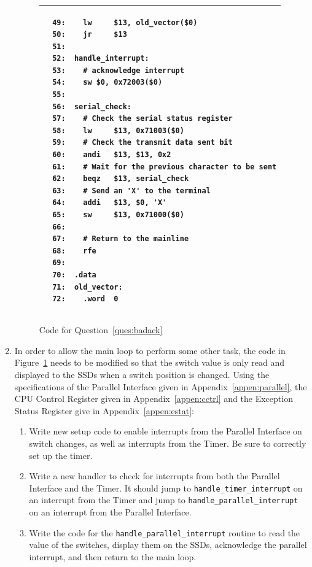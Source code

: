 \documentclass[a4paper,10pt]{article}
\begin{document}
\begin{enumerate}
\begin{figure}[p]
\begin{footnotesize}
\begin{center}
\begin{tabular}{|p{12cm}|}
\begin{verbatim}
  49:    lw     $13, old_vector($0)
  50:    jr     $13
  51:    
  52:  handle_interrupt:
  53:    # acknowledge interrupt
  54:    sw $0, 0x72003($0)
  55:	 
  56:  serial_check:
  57:    # Check the serial status register
  58:    lw     $13, 0x71003($0)
  59:    # Check the transmit data sent bit
  60:    andi   $13, $13, 0x2
  61:    # Wait for the previous character to be sent
  62:    beqz   $13, serial_check
  63:    # Send an 'X' to the terminal
  64:    addi   $13, $0, 'X'
  65:    sw     $13, 0x71000($0)
  66:    
  67:    # Return to the mainline
  68:    rfe
  69:
  70:  .data
  71:  old_vector:
  72:    .word  0
\end{verbatim}
\\ \hline
\end{tabular}
\end{center}
\end{footnotesize}
\caption{Code for Question~\ref{ques:badack}}
\label{code:badack}
\end{figure}

\clearpage
\item In order to allow the main loop to perform some other task, the code in
Figure~\ref{code:badack} needs to be modified so that the switch value is only
read and displayed to the SSDs when a switch position is changed.   Using the
specifications of the Parallel Interface given in Appendix~\ref{appen:parallel},
the CPU Control Register given in Appendix~\ref{appen:cctrl} and the Exception
Status Register give in Appendix~\ref{appen:estat}:

\begin{enumerate}

\item Write new setup code to enable interrupts from the Parallel Interface on
switch changes, as well as interrupts from the Timer.  Be sure to correctly set
up the timer.


\item Write a new handler to check for interrupts from both the Parallel
Interface and the Timer.  It should jump to \texttt{handle\_timer\_interrupt} on
an interrupt from the Timer and jump to \texttt{handle\_parallel\_interrupt} on
an interrupt from the Parallel Interface.


\item Write the code for the \texttt{handle\_parallel\_interrupt} routine to read
the value of the switches, display them on the SSDs, acknowledge the parallel interrupt,
and then return to the main loop.


\end{enumerate}

\end{enumerate}
\end{document}

